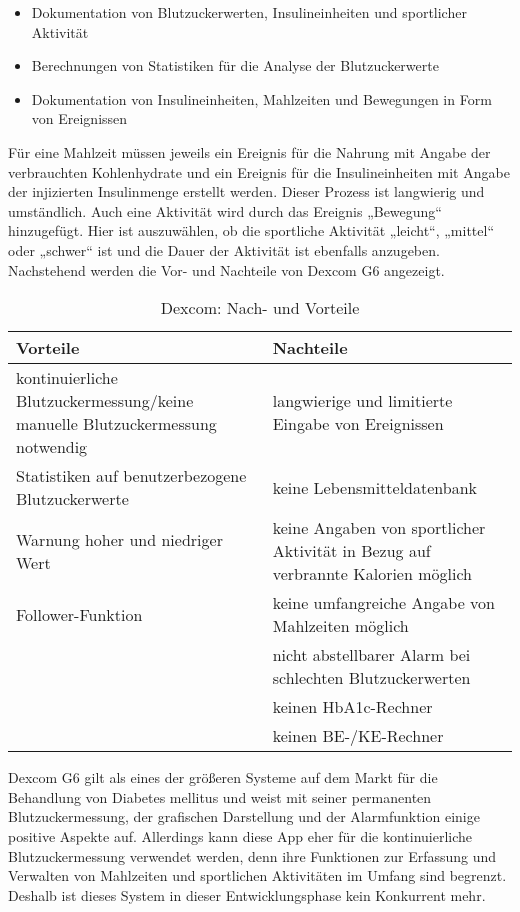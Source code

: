 	\begin{itemize}
		\item Dokumentation von Blutzuckerwerten, Insulineinheiten und sportlicher Aktivität
		\item Berechnungen von Statistiken für die Analyse der Blutzuckerwerte
		\item Dokumentation von Insulineinheiten, Mahlzeiten und Bewegungen in Form von Ereignissen
	\end{itemize}
	Für eine Mahlzeit müssen jeweils ein Ereignis für die Nahrung mit Angabe der verbrauchten Kohlenhydrate und ein Ereignis für die Insulineinheiten mit Angabe der injizierten Insulinmenge erstellt werden. Dieser Prozess ist langwierig und umständlich. Auch eine Aktivität wird durch das Ereignis „Bewegung“ hinzugefügt. Hier ist auszuwählen, ob die sportliche Aktivität  „leicht“, „mittel“ oder „schwer“ ist und die Dauer der Aktivität ist ebenfalls anzugeben. \newline
	Nachstehend werden die Vor- und Nachteile von Dexcom G6 angezeigt. \cite{D}
	\begin{table}[H]
		\setlength{\tabcolsep}{12pt}
		\centering
		\begin{tabular}{p{6cm}|p{6cm}}
			\toprule
			\textbf{Vorteile} & \textbf{Nachteile}\\
			\hline
			kontinuierliche Blutzuckermessung/keine manuelle Blutzuckermessung notwendig & langwierige und limitierte Eingabe von Ereignissen\\
			\hline
			Statistiken auf benutzerbezogene Blutzuckerwerte & keine Lebensmitteldatenbank\\
			\hline
			Warnung hoher und niedriger Wert & keine Angaben von sportlicher Aktivität in Bezug auf verbrannte Kalorien möglich\\
			\hline
			Follower-Funktion & keine umfangreiche Angabe von Mahlzeiten möglich\\
			\hline
			 & nicht abstellbarer Alarm bei schlechten Blutzuckerwerten\\
			 \hline
			 & keinen HbA1c-Rechner\\
			 \hline
			 & keinen BE-/KE-Rechner\\
			\bottomrule
		\end{tabular}
		\captionsetup{justification=centering}
		\caption{Dexcom: Nach- und Vorteile}
		\label{tab:Dexcom}
	\end{table}
	\setlength{\parindent}{0pt}Dexcom G6 gilt als eines der größeren Systeme auf dem Markt für die Behandlung von Diabetes mellitus und weist mit seiner permanenten Blutzuckermessung, der grafischen Darstellung und der Alarmfunktion einige positive Aspekte auf. Allerdings kann diese App eher für die kontinuierliche Blutzuckermessung verwendet werden, denn ihre Funktionen zur Erfassung und Verwalten von Mahlzeiten und sportlichen Aktivitäten im Umfang sind begrenzt. Deshalb ist dieses System in dieser Entwicklungsphase kein Konkurrent mehr.\newline
